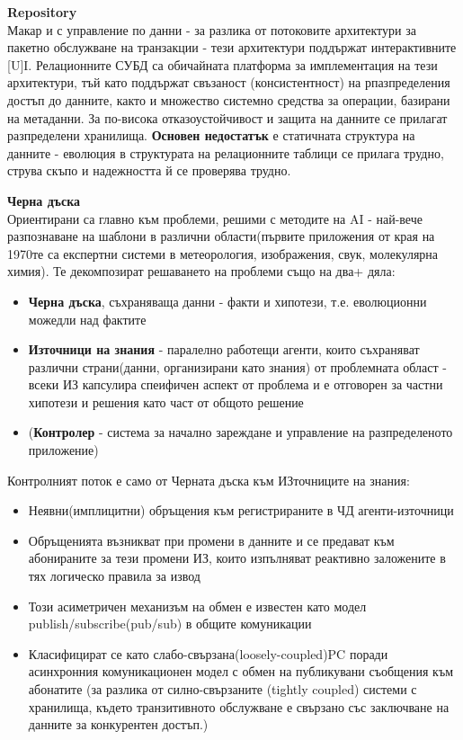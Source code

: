 \documentclass[11pt]{article} %
\begin{document}
\textbf{Repository}\\
Макар и с управление по данни - за разлика от потоковите архитектури за пакетно обслужване на транзакции - тези архитектури поддържат интерактивните [U]I. Релационните СУБД са обичайната платформа за имплементация на тези архитектури, тъй като поддържат свъзаност (консистентност) на рпазпределения достъп до данните, както и множество системно средства за операции, базирани на метаданни. За по-висока отказоустойчивост и защита на данните се прилагат разпределени хранилища. \textbf{Основен недостатък} е статичната структура на данните - еволюция в структурата на релационните таблици се прилага трудно, струва скъпо и надежността й се проверява трудно.\\\par

\textbf{Черна дъска}\\
Ориентирани са главно към проблеми, решими с методите на AI - най-вече разпознаване на шаблони в различни области(първите приложения от края на 1970те са експертни системи в метеорология, изображения, свук, молекулярна химия). Те декомпозират решаването на проблеми също на два+ дяла:
\begin{itemize}[noitemsep]
	\item \textbf{Черна дъска}, съхраняваща данни - факти и хипотези, т.е. еволюционни можедли над фактите
	\item \textbf{Източници на знания} - паралелно работещи агенти, които съхраняват различни страни(данни, организирани като знания) от проблемната област - всеки ИЗ капсулира спеифичен аспект от проблема и е отговорен за частни хипотези и решения като част от общото решение
	\item (\textbf{Контролер} - система за начално зареждане и управление на разпределеното приложение)
\end{itemize}

Контролният поток е само от Черната дъска към ИЗточниците на знания:
\begin{itemize}[noitemsep]
	\item Неявни(имплицитни) обръщения към регистрираните в ЧД агенти-източници
	\item Обръщенията възникват при промени в данните и се предават към абонираните за тези промени ИЗ, които изпълняват реактивно заложените в тях логическо правила за извод
	\item Този асиметричен механизъм на обмен е известен като модел publish/subscribe(pub/sub) в общите комуникации 
	\item Класифицират се като слабо-свързана(loosely-coupled)PC поради асинхронния комуникационен модел с обмен на публикувани съобщения към абонатите (за разлика от силно-свързаните (tightly coupled) системи с хранилища, където транзитивното обслужване е свързано със заключване на данните за конкурентен достъп.)\\\par
\end{itemize}
\end{document}
